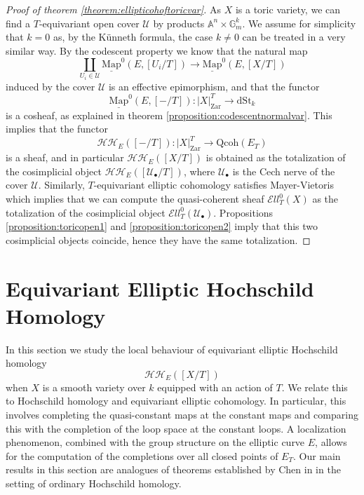 \documentclass[11pt,letterpaper]{amsart}
\newcommand{\bA}{\mathbb{A}}
\newcommand{\bG}{\mathbb{G}}
\newcommand{\cU}{\mathcal{U}}
\newcommand{\cHH}{\mathcal{HH}}
\newcommand{\Mapo}[2]{\underline{\mathrm{Map}}^{0}\left (#1,#2\right )}
\newcommand{\dStk}{\mathrm{dSt}_{k}}
\newcommand{\El}{\mathcal{E}ll}
\newcommand{\Zar}[1]{|#1|_{\mathrm{Zar}}}
\newcommand{\Qcoh}{\mathrm{Qcoh}}
\begin{document}
\begin{proof}[Proof of theorem \ref{theorem:ellipticohoftoricvar}]
As $X$ is a toric variety, we can find a $T$-equivariant open cover $\cU$ by products $\bA^n\times\bG_m^k$. We assume for simplicity that $k=0$ as, by the K\"unneth formula, the case $k\neq 0$ can be treated in a very similar way. %
By the codescent property we know that the natural map
\begin{equation*}
\coprod_{U_i\in\cU}\Mapo{E}{[U_i/T]}\rightarrow\Mapo{E}{[X/T]}
\end{equation*}
induced by the cover $\cU$ is an effective epimorphism, and that the functor
$$
\Mapo{E}{[-/T]}: \Zar{X}^T \rightarrow\dStk
$$
is a cosheaf, as explained in theorem \ref{proposition:codescentnormalvar}. This implies that the functor
\begin{equation*}
\cHH_E([-/T]): \Zar{X}^T \rightarrow\Qcoh(E_T)
\end{equation*}
is a sheaf, and in particular $\cHH_E([X/T])$ is obtained as the totalization of the cosimplicial object $\cHH_E([\cU_\bullet/T])$, where $\cU_\bullet$ is the Cech nerve of the cover $\cU$.
Similarly, $T$-equivariant elliptic cohomology satisfies Mayer-Vietoris which implies that we can compute the quasi-coherent sheaf $\El_T^0(X)$ as the totalization of the cosimplicial object $\El_T^0(\cU_\bullet)$. 
Propositions \ref{proposition:toricopen1} and \ref{proposition:toricopen2} imply that this two cosimplicial objects coincide, hence they have the same totalization. 
\end{proof}

\section{Equivariant Elliptic Hochschild Homology}\label{section:HELL}
In this section we study the local behaviour of  equivariant elliptic Hochschild homology $$\cHH_E([X/T])$$ when $X$  is a smooth variety over $k$ equipped with an action of $T$. We relate this to Hochschild homology and equivariant elliptic cohomology. 
In particular, this involves completing the quasi-constant maps at the constant maps and comparing this   with the completion of the loop space at the constant loops. A localization phenomenon, combined with the group structure on the elliptic curve $E$, allows for the computation of the completions over all closed points of $E_T$. Our main results in this section are  analogues of theorems established by Chen in \cite{HChen}  in the setting of  ordinary Hochschild homology. 
\end{document}
